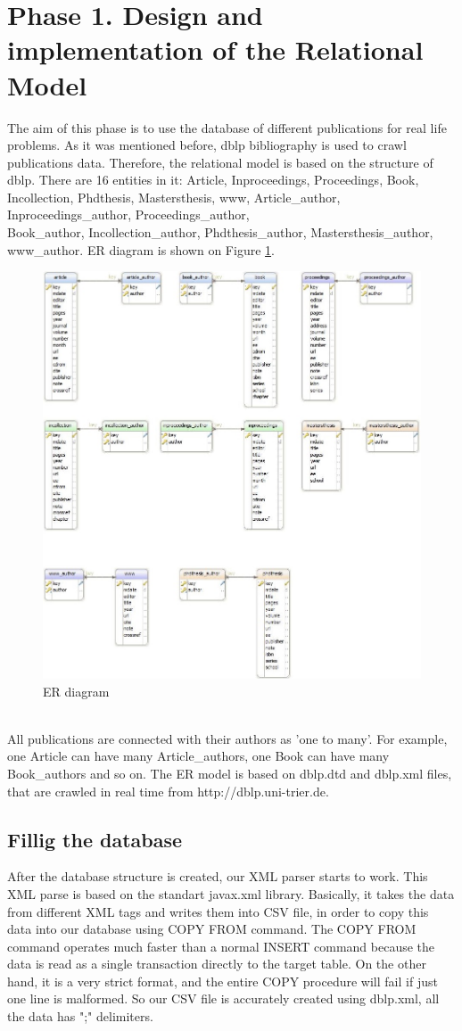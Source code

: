 \documentclass{acm_proc_article-sp}
\begin{document}
\section{Phase 1. Design and implementation of the Relational Model}
The aim of this phase is to use the database of different publications for real life problems. As it was mentioned before, dblp bibliography is used to crawl publications data. Therefore, the relational model is based on the structure of dblp. There are 16 entities in it: Article,  Inproceedings, Proceedings, Book, Incollection, Phdthesis, Mastersthesis, www, Article\_author,  Inproceedings\_author, Proceedings\_author,\\ Book\_author, Incollection\_author, Phdthesis\_author, Mastersthesis\_author, www\_author. ER diagram is shown on Figure \ref{fig:ER}.
\begin{figure}[h]
	\centering
	\includegraphics[width=0.7\linewidth]{ER}
	\caption{ER diagram}
	\label{fig:ER}
\end{figure}
\\All publications are connected with their authors as 'one to many'. For example, one Article can have many Article\_authors, one Book can have many Book\_authors and so on. The ER model is based on dblp.dtd and dblp.xml files, that are crawled in real time from http://dblp.uni-trier.de.
\subsection{Fillig the database}
After the database structure is created, our XML parser starts to work. This XML parse is based on the standart javax.xml library. Basically, it takes the data from different XML tags and writes them into CSV file, in order to copy this data into our database using COPY FROM command. The COPY FROM command operates much faster than a normal INSERT command because the data is read as a single transaction directly to the target table. On the other hand, it is a very strict format, and the entire COPY procedure will fail if just one line is malformed.	So our CSV file is accurately created using dblp.xml, all the data has ";" delimiters.
\end{document}
